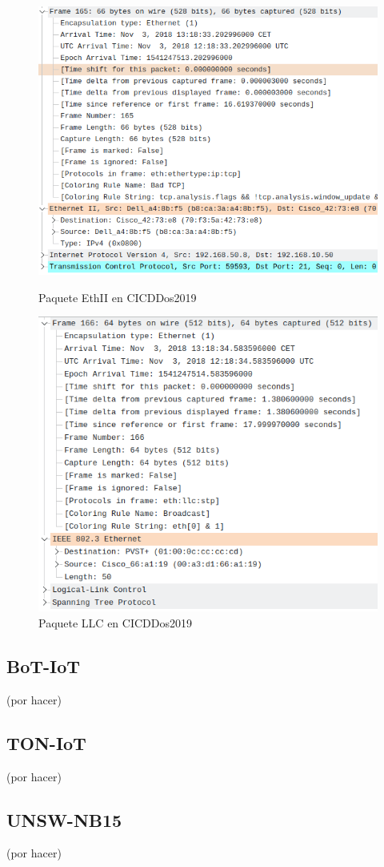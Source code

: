\begin{figure}[H]
      \includegraphics[width=\linewidth]{media/cicddos_2019_pcap_03-11_0_ethii_packet.png}
      \captionsetup{justification=centering}
      \caption{Paquete EthII en CICDDos2019}\label{fig:cicddos_2019_pcap_03-11_0_ethii_packet}
    \endminipage\hfill
      \includegraphics[width=\linewidth]{media/cicddos_2019_pcap_03-11_0_llc_packet.png}
      \captionsetup{justification=centering}
      \caption{Paquete LLC en CICDDos2019}\label{fig:cicddos_2019_pcap_03-11_0_llc_packet}
    \endminipage\hfill
\end{figure}

\subsection{BoT-IoT}

(por hacer)

\subsection{TON-IoT}

(por hacer)

\subsection{UNSW-NB15}

(por hacer)
